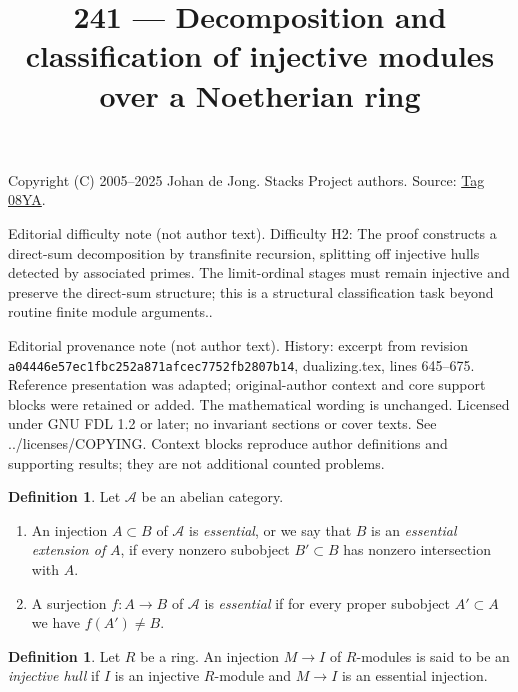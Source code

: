 \documentclass{amsart}
\theoremstyle{plain}
\theoremstyle{definition}
\newtheorem{definition}[subsection]{Definition}
\theoremstyle{remark}
\numberwithin{equation}{subsection}
\begin{document}
\title[Stacks Project, Tag 08YA]{241 --- Decomposition and classification of injective modules over a Noetherian ring}
\maketitle
\noindent Copyright (C) 2005--2025 Johan de Jong. Stacks Project authors. Source: \href{https://stacks.math.columbia.edu/tag/08YA}{Tag 08YA}.

\noindent Editorial difficulty note (not author text). Difficulty H2: The proof constructs a direct-sum decomposition by transfinite recursion, splitting off injective hulls detected by associated primes. The limit-ordinal stages must remain injective and preserve the direct-sum structure; this is a structural classification task beyond routine finite module arguments..

\noindent Editorial provenance note (not author text). History: excerpt from revision \texttt{a0444\allowbreak 6e57e\allowbreak c1fbc\allowbreak 252a8\allowbreak 71afc\allowbreak ec775\allowbreak 2fb28\allowbreak 07b14}, dualizing.tex, lines 645--675. Reference presentation was adapted; original-author context and core support blocks were retained or added. The mathematical wording is unchanged. Licensed under GNU FDL 1.2 or later; no invariant sections or cover texts. See ../licenses/COPYING. Context blocks reproduce author definitions and supporting results; they are not additional counted problems.

\begin{definition}
\label{definition-essential}
Let $\mathcal{A}$ be an abelian category.
\begin{enumerate}
\item An injection $A \subset B$ of $\mathcal{A}$ is {\it essential},
or we say that $B$ is an {\it essential extension of} $A$,
if every nonzero subobject $B' \subset B$ has nonzero intersection with $A$.
\item A surjection $f : A \to B$ of $\mathcal{A}$ is {\it essential}
if for every proper subobject $A' \subset A$ we have $f(A') \not = B$.
\end{enumerate}
\end{definition}

\begin{definition}
\label{definition-injective-hull}
Let $R$ be a ring. An injection $M \to I$ of $R$-modules is said
to be an {\it injective hull} if $I$ is an injective $R$-module and
$M \to I$ is an essential injection.
\end{definition}
\end{document}
